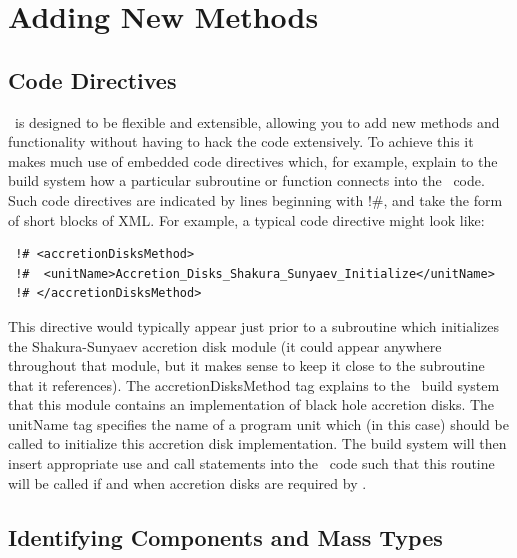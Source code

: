 \chapter{Adding New Methods}

\section{Code Directives}\label{sec:CodeDirectives}

\glc\ is designed to be flexible and extensible, allowing you to add new methods and functionality without having to hack the code extensively. To achieve this it makes much use of embedded code directives which, for example, explain to the build system how a particular subroutine or function connects into the \glc\ code. Such code directives are indicated by lines beginning with {\normalfont \ttfamily !\#}, and take the form of short blocks of XML. For example, a typical code directive might look like:
\begin{verbatim}
 !# <accretionDisksMethod>
 !#  <unitName>Accretion_Disks_Shakura_Sunyaev_Initialize</unitName>
 !# </accretionDisksMethod>
\end{verbatim}
This directive would typically appear just prior to a subroutine which initializes the Shakura-Sunyaev accretion disk module (it could appear anywhere throughout that module, but it makes sense to keep it close to the subroutine that it references). The {\normalfont \ttfamily accretionDisksMethod} tag explains to the \glc\ build system that this module contains an implementation of black hole accretion disks. The {\normalfont \ttfamily unitName} tag specifies the name of a program unit which (in this case) should be called to initialize this accretion disk implementation. The build system will then insert appropriate {\normalfont \ttfamily use} and {\normalfont \ttfamily call} statements into the \glc\ code such that this routine will be called if and when accretion disks are required by \glc.

\section{Identifying Components and Mass Types}\label{sec:ComponentMassTypes}

